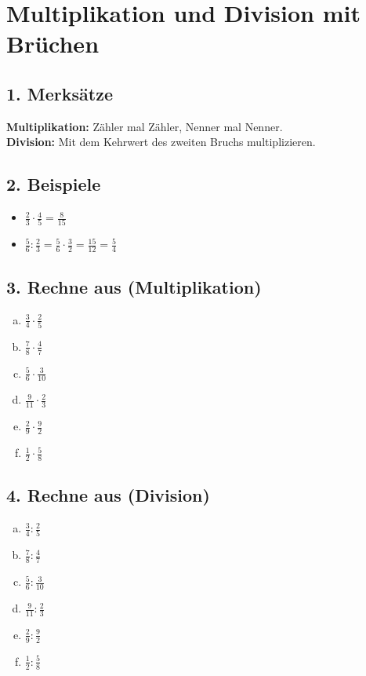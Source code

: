 
\section*{Multiplikation und Division mit Brüchen}

\subsection*{1. Merksätze}
\textbf{Multiplikation:} Zähler mal Zähler, Nenner mal Nenner.\\
\textbf{Division:} Mit dem Kehrwert des zweiten Bruchs multiplizieren.

\subsection*{2. Beispiele}
\begin{itemize}
    \item $\frac{2}{3} \cdot \frac{4}{5} = \frac{8}{15}$
    \item $\frac{5}{6} : \frac{2}{3} = \frac{5}{6} \cdot \frac{3}{2} = \frac{15}{12} = \frac{5}{4}$
\end{itemize}

\subsection*{3. Rechne aus (Multiplikation)}
\begin{multicols}{2}
\begin{enumerate}[a)]
    \item $\frac{3}{4} \cdot \frac{2}{5}$
    \item $\frac{7}{8} \cdot \frac{4}{7}$
    \item $\frac{5}{6} \cdot \frac{3}{10}$
    \item $\frac{9}{11} \cdot \frac{2}{3}$
    \item $\frac{2}{9} \cdot \frac{9}{2}$
    \item $\frac{1}{2} \cdot \frac{5}{8}$
\end{enumerate}
\end{multicols}

\subsection*{4. Rechne aus (Division)}
\begin{multicols}{2}
\begin{enumerate}[a)]
    \item $\frac{3}{4} : \frac{2}{5}$
    \item $\frac{7}{8} : \frac{4}{7}$
    \item $\frac{5}{6} : \frac{3}{10}$
    \item $\frac{9}{11} : \frac{2}{3}$
    \item $\frac{2}{9} : \frac{9}{2}$
    \item $\frac{1}{2} : \frac{5}{8}$
\end{enumerate}
\end{multicols}


